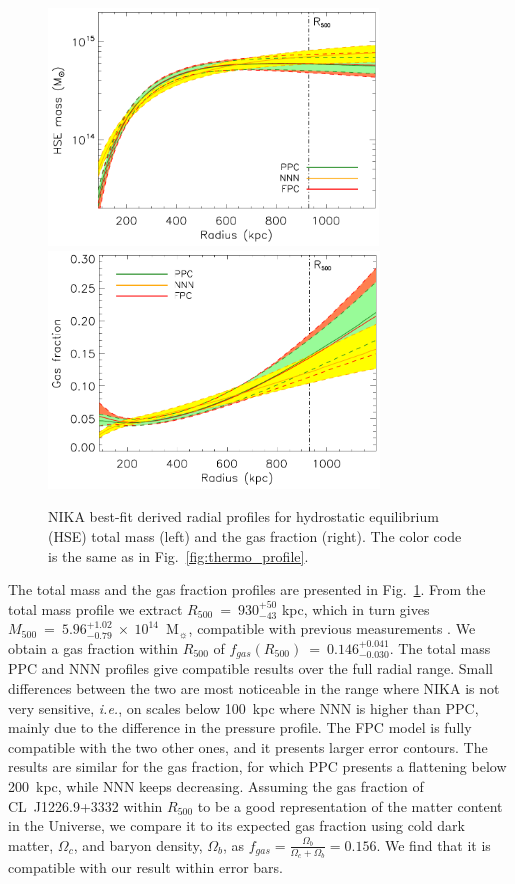 \documentclass[twocolumn,traditabstract]{aa}
\begin{document}
	\begin{figure}[h]
	\centering
	\includegraphics[height=6.3cm]{Figure/totmass_profile.pdf}
	\includegraphics[height=6.3cm]{Figure/fgaz_profile.pdf}
	\caption{NIKA best-fit derived radial profiles for hydrostatic equilibrium (HSE) total mass (left) and the gas fraction (right). The color code is the same as in Fig.~\ref{fig:thermo_profile}.}
        \label{fig:mass_profile}
	\end{figure}
The total mass and the gas fraction profiles are presented in Fig.~\ref{fig:mass_profile}. From the total mass profile we extract $R_{500}~=~930^{+50}_{-43}$ kpc, which in turn gives $M_{500}~=~5.96^{+1.02}_{-0.79}~\times~10^{14}$~M$_{\sun}$, compatible with previous measurements \citep[e.g.,][]{mroczkowski2009, maughan2007}. We obtain a gas fraction within $R_{500}$ of $f_{gas}(R_{500})~=~0.146^{+0.041}_{-0.030}$. The total mass PPC and NNN profiles give compatible results over the full radial range. Small differences between the two are most noticeable in the range where NIKA is not very sensitive, {\it i.e.}, on scales below 100~kpc where NNN is higher than PPC, mainly due to the difference in the pressure profile. The FPC model is fully compatible with the two other ones, and it presents larger error contours. The results are similar for the gas fraction, for which PPC presents a flattening below 200~kpc, while NNN keeps decreasing. Assuming the gas fraction of \mbox{CL~J1226.9+3332} within $R_{500}$ to be a good representation of the matter content in the Universe, we compare it to its expected gas fraction using \cite{planck2013param} cold dark matter, $\Omega_c$, and baryon density, $\Omega_b$, as $f_{gas} = \frac{\Omega_b}{\Omega_c + \Omega_b} = 0.156$. We find that it is compatible with our result within error bars.
\end{document}
